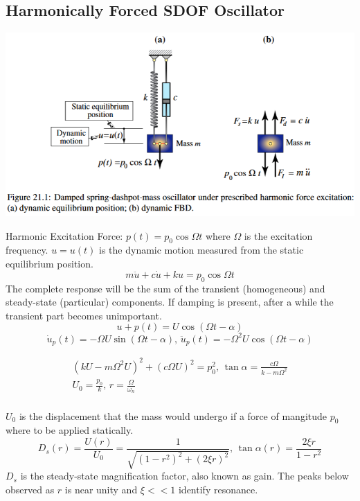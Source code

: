 \documentclass{article}
\begin{document}
\begin{multicols*}{2}
    \section*{Harmonically Forced SDOF Oscillator}
    \includegraphics[width=\linewidth]{Figures/forced_oscillator.png}\par 
    Harmonic Excitation Force: $p(t)=p_0\cos{\Omega t}$ where $\Omega$ is the excitation frequency. $u=u(t)$ is the dynamic motion measured
    from the static equilibrium position.
    $$\boxed{m\ddot{u}+c\dot{u}+ku=p_0\cos{\Omega t}}$$
    The complete response will be the sum of the transient (homogeneous) and steady-state (particular) components. If 
    damping is present, after a while the transient part becomes unimportant. 
    $$\boxed{u+p(t)=U\cos{(\Omega t-\alpha)}}$$
    $$\dot{u}_p(t)=-\Omega U \sin{(\Omega t- \alpha)} \text{, } \ddot{u}_p(t) = -\Omega^2U\cos{(\Omega t-\alpha)}$$

    \begin{equation*}
        \begin{array}{l}
            (kU-m\Omega^2U)^2+(c\Omega U)^2 = p_0^2 \text{, } \tan{\alpha}=\frac{c\Omega}{k-m\Omega^2}\\
            U_0=\frac{p_0}{k} \text{, } r = \frac{\Omega}{\omega_n}\\
        \end{array}
    \end{equation*}

    $U_0$ is the displacement that the mass would undergo if a force of mangitude $p_0$ where to be applied statically.
    $$\boxed{D_s(r) = \frac{U(r)}{U_0}=\frac{1}{\sqrt{(1-r^2)^2+(2\xi r)^2}} \text{, } \tan{\alpha(r)}=\frac{2\xi r}{1-r^2}}$$
    $D_s$ is the steady-state magnification factor, also known as gain. The peaks below observed as $r$ is near unity and $\xi << 1$ identify resonance.
    

\end{multicols*}
\end{document}
